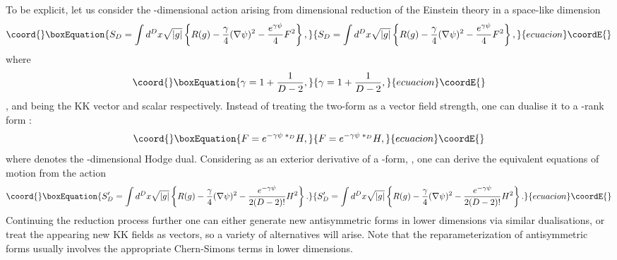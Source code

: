 \documentclass[a4paper,12pt]{article}
\begin{document}
To be explicit, let us consider the \coordHE{}-dimensional action
arising from dimensional reduction of the \coordHE{} Einstein theory
in a space-like dimension
\begin{equation}\coord{}\boxEquation{\label{SF}
S_{D} = \int d^D x \sqrt{|g|} \left\{ R(g) -
\frac{\gamma}4(\nabla\psi)^2 - \frac{e^{\gamma\psi}}4 F^2
\right\},
}{S_{D} = \int d^D x \sqrt{|g|} \left\{ R(g) -
\frac{\gamma}4(\nabla\psi)^2 - \frac{e^{\gamma\psi}}4 F^2
\right\},
}{ecuacion}\coordE{}\end{equation}
where
\begin{equation}\coord{}\boxEquation{
\gamma = 1 + \frac1{D-2},
}{
\gamma = 1 + \frac1{D-2},
}{ecuacion}\coordE{}\end{equation}
\coordHE{}, and \coordHE{} being the KK vector and scalar
respectively. Instead of treating the two-form \coordHE{} as a vector
field strength, one can dualise it to a \coordHE{}-rank form \coordHE{}:
\begin{equation}\coord{}\boxEquation{ \label{DF}
F = e^{-\gamma\psi}\,{}^{*_D}H,
}{ F = e^{-\gamma\psi}\,{}^{*_D}H,
}{ecuacion}\coordE{}\end{equation}
where \coordHE{} denotes the \coordHE{}-dimensional Hodge dual.
Considering \coordHE{} as an exterior derivative of a \coordHE{}-form,
\coordHE{}, one can derive the equivalent equations of motion from
the action
\begin{equation}\coord{}\boxEquation{ \label{SH}
S'_{D} = \int d^Dx \sqrt{|g|} \left\{ R(g) -
\frac{\gamma}4(\nabla\psi)^2 - \frac{e^{-\gamma\psi}}{2(D-2)!}
H^2 \right\}.
}{ S'_{D} = \int d^Dx \sqrt{|g|} \left\{ R(g) -
\frac{\gamma}4(\nabla\psi)^2 - \frac{e^{-\gamma\psi}}{2(D-2)!}
H^2 \right\}.
}{ecuacion}\coordE{}\end{equation}
Continuing the reduction process further one can either generate
new antisymmetric forms in lower dimensions via similar
dualisations, or treat the appearing new KK fields as vectors, so
a variety of alternatives will arise. Note that the
reparameterization of antisymmetric forms usually involves the
appropriate Chern-Simons terms in lower dimensions.
\end{document}
